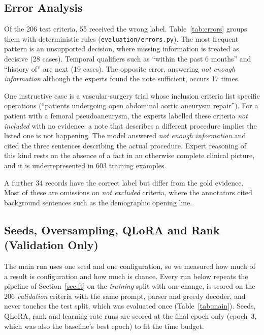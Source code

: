 \subsection{Error Analysis}

Of the 206 test criteria, 55 received the wrong label. Table~\ref{tab:errors} groups them with deterministic
rules (\texttt{evaluation/errors.py}). The most frequent pattern is an unsupported decision, where missing
information is treated as decisive (28 cases). Temporal qualifiers such as ``within the past 6 months'' and
``history of'' are next (19 cases). The opposite error, answering \emph{not enough information} although the
experts found the note sufficient, occurs 17 times.

One instructive case is a vascular-surgery trial whose inclusion criteria list specific operations
(``patients undergoing open abdominal aortic aneurysm repair''). For a patient with a femoral pseudoaneurysm,
the experts labelled these criteria \emph{not included} with no evidence: a note that describes a different
procedure implies the listed one is not happening. The model answered \emph{not enough information} and cited
the three sentences describing the actual procedure. Expert reasoning of this kind rests on the absence of a
fact in an otherwise complete clinical picture, and it is underrepresented in 603 training examples.

A further 34 records have the correct label but differ from the gold evidence. Most of these are omissions on
\emph{not excluded} criteria, where the annotators cited background sentences such as the demographic opening
line.

\subsection{Seeds, Oversampling, QLoRA and Rank (Validation Only)}\label{sec:res-extra}

The main run uses one seed and one configuration, so we measured how much of a result is configuration and how
much is chance. Every run below repeats the pipeline of Section~\ref{sec:ft} on the \emph{training} split with one
change, is scored on the 206 \emph{validation} criteria with the same prompt, parser and greedy decoder, and never
touches the test split, which was evaluated once (Table~\ref{tab:main}). Seeds, QLoRA, rank and learning-rate runs are scored
at the final epoch only (epoch~3, which was also the baseline's best epoch) to fit the time budget.


